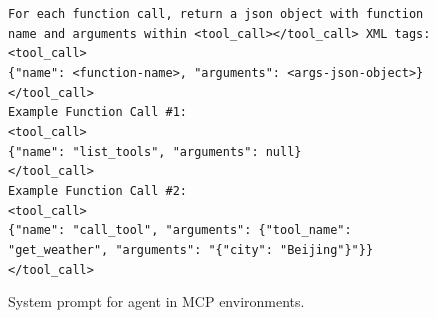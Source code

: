 \begin{figure}[t]
{\begin{minipage}{0.97\textwidth}
        \texttt{For each function call, return a json object with function name and arguments within <tool\_call></tool\_call> XML tags:}\\
        \texttt{<tool\_call>}\\
        \texttt{\{"name": <function-name>, "arguments": <args-json-object>\}}\\
        \texttt{</tool\_call>}\\[6pt]

        \texttt{Example Function Call \#1:}\\
        \texttt{<tool\_call>}\\
        \texttt{\{"name": "list\_tools", "arguments": null\}}\\
        \texttt{</tool\_call>}\\[4pt]

        \texttt{Example Function Call \#2:}\\
        \texttt{<tool\_call>}\\
        \texttt{\{"name": "call\_tool", "arguments": \{"tool\_name": "get\_weather", "arguments": "\{"city": "Beijing"\}"\}\}}\\
        \texttt{</tool\_call>}\\[2pt]

        \vspace{1pt}
        \end{minipage}
    }
    \captionsetup{labelformat=default, name=Table}
    \caption{System prompt for agent in MCP environments.}
    \label{fig:agent-system-prompt}
\end{figure}
